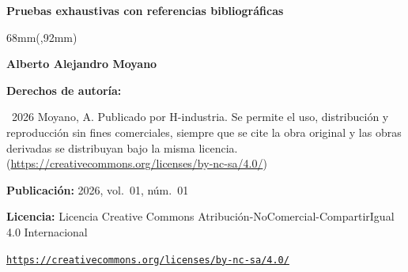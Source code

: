 \documentclass{article}
\newlength{\gbbloquex}
\newcommand{\articulotipo}{}
\newcommand{\articulotitulo}{}
\newcommand{\articuloautores}{}
\newcommand{\articuloidiomaxml}{es}
\newcommand{\articulorevista}{}
\newcommand{\articuloissne}{}
\newcommand{\articulovolumen}{}
\newcommand{\articulonumero}{}
\newcommand{\articulofecha}{}
\begin{document}

\renewcommand{\articuloidiomaxml}{es}
\renewcommand{\articulotitulo}{Pruebas exhaustivas con referencias bibliográficas}
\renewcommand{\articuloautores}{Alberto Alejandro Moyano}
\renewcommand{\articulotipo}{OTHER}
\renewcommand{\articulorevista}{H-industria}
\renewcommand{\articuloissne}{1851-703X}
\renewcommand{\articulovolumen}{01}
\renewcommand{\articulonumero}{01}
\renewcommand{\articulofecha}{NOVIEMBRE 2026}

\setcounter{page}{1}
\thispagestyle{firstpage}

\noindent\begin{minipage}[t]{\dimexpr\textwidth+\marginparsep+\marginparwidth\relax}%
{\sffamily\bfseries\Large\articulotitulo\par}%
\end{minipage}\par
\vspace{3mm}%

\begin{textblock*}{68mm}(\gbbloquex,92mm)
{\setlength{\leftskip}{0pt}\setlength{\parindent}{0pt}%
\noindent\begin{minipage}[t]{68mm}
\sffamily\small\setlength{\parskip}{1pt}
{\bfseries\color{azulrevista}Alberto Alejandro Moyano}\par
\vspace{6pt}
{\bfseries\color{azulrevista!70}Derechos de autor\'ia:}\par
\textcopyright\ 2026 Moyano, A. Publicado por H-industria. Se permite el uso, distribución y reproducción sin fines comerciales, siempre que se cite la obra original y las obras derivadas se distribuyan bajo la misma licencia. (\href{https://creativecommons.org/licenses/by-nc-sa/4.0/}{https://creativecommons.org/licenses/by-nc-sa/4.0/})\par\vspace{6pt}
{\bfseries\color{azulrevista!70}Publicación:} 2026, vol.~01, n\'um.~01\par\vspace{6pt}
{\bfseries\color{azulrevista!70}Licencia:} Licencia Creative Commons Atribución-NoComercial-CompartirIgual 4.0 Internacional\par
{\scriptsize\texttt{\href{https://creativecommons.org/licenses/by-nc-sa/4.0/}{https://creativecommons.org/licenses/by-nc-sa/4.0/}}}\par
\vspace{6pt}
\end{minipage}%
}%
\end{textblock*}
\end{document}
